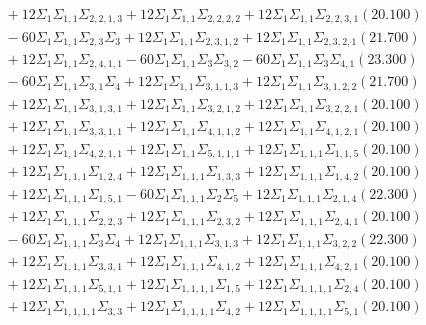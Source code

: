 \documentclass[12pt]{article}
\begin{document}
\begin{landscape}
\begin{align*}
		&\quad\quad +12\Sigma_{1}\Sigma_{1,1}\Sigma_{2,2,1,3}+12\Sigma_{1}\Sigma_{1,1}\Sigma_{2,2,2,2}+12\Sigma_{1}\Sigma_{1,1}\Sigma_{2,2,3,1}(20.100) \\ 
		&\quad\quad -60\Sigma_{1}\Sigma_{1,1}\Sigma_{2,3}\Sigma_{3}+12\Sigma_{1}\Sigma_{1,1}\Sigma_{2,3,1,2}+12\Sigma_{1}\Sigma_{1,1}\Sigma_{2,3,2,1}(21.700) \\ 
		&\quad\quad +12\Sigma_{1}\Sigma_{1,1}\Sigma_{2,4,1,1}-60\Sigma_{1}\Sigma_{1,1}\Sigma_{3}\Sigma_{3,2}-60\Sigma_{1}\Sigma_{1,1}\Sigma_{3}\Sigma_{4,1}(23.300) \\ 
		&\quad\quad -60\Sigma_{1}\Sigma_{1,1}\Sigma_{3,1}\Sigma_{4}+12\Sigma_{1}\Sigma_{1,1}\Sigma_{3,1,1,3}+12\Sigma_{1}\Sigma_{1,1}\Sigma_{3,1,2,2}(21.700) \\ 
		&\quad\quad +12\Sigma_{1}\Sigma_{1,1}\Sigma_{3,1,3,1}+12\Sigma_{1}\Sigma_{1,1}\Sigma_{3,2,1,2}+12\Sigma_{1}\Sigma_{1,1}\Sigma_{3,2,2,1}(20.100) \\ 
		&\quad\quad +12\Sigma_{1}\Sigma_{1,1}\Sigma_{3,3,1,1}+12\Sigma_{1}\Sigma_{1,1}\Sigma_{4,1,1,2}+12\Sigma_{1}\Sigma_{1,1}\Sigma_{4,1,2,1}(20.100) \\ 
		&\quad\quad +12\Sigma_{1}\Sigma_{1,1}\Sigma_{4,2,1,1}+12\Sigma_{1}\Sigma_{1,1}\Sigma_{5,1,1,1}+12\Sigma_{1}\Sigma_{1,1,1}\Sigma_{1,1,5}(20.100) \\ 
		&\quad\quad +12\Sigma_{1}\Sigma_{1,1,1}\Sigma_{1,2,4}+12\Sigma_{1}\Sigma_{1,1,1}\Sigma_{1,3,3}+12\Sigma_{1}\Sigma_{1,1,1}\Sigma_{1,4,2}(20.100) \\ 
		&\quad\quad +12\Sigma_{1}\Sigma_{1,1,1}\Sigma_{1,5,1}-60\Sigma_{1}\Sigma_{1,1,1}\Sigma_{2}\Sigma_{5}+12\Sigma_{1}\Sigma_{1,1,1}\Sigma_{2,1,4}(22.300) \\ 
		&\quad\quad +12\Sigma_{1}\Sigma_{1,1,1}\Sigma_{2,2,3}+12\Sigma_{1}\Sigma_{1,1,1}\Sigma_{2,3,2}+12\Sigma_{1}\Sigma_{1,1,1}\Sigma_{2,4,1}(20.100) \\ 
		&\quad\quad -60\Sigma_{1}\Sigma_{1,1,1}\Sigma_{3}\Sigma_{4}+12\Sigma_{1}\Sigma_{1,1,1}\Sigma_{3,1,3}+12\Sigma_{1}\Sigma_{1,1,1}\Sigma_{3,2,2}(22.300) \\ 
		&\quad\quad +12\Sigma_{1}\Sigma_{1,1,1}\Sigma_{3,3,1}+12\Sigma_{1}\Sigma_{1,1,1}\Sigma_{4,1,2}+12\Sigma_{1}\Sigma_{1,1,1}\Sigma_{4,2,1}(20.100) \\ 
		&\quad\quad +12\Sigma_{1}\Sigma_{1,1,1}\Sigma_{5,1,1}+12\Sigma_{1}\Sigma_{1,1,1,1}\Sigma_{1,5}+12\Sigma_{1}\Sigma_{1,1,1,1}\Sigma_{2,4}(20.100) \\ 
		&\quad\quad +12\Sigma_{1}\Sigma_{1,1,1,1}\Sigma_{3,3}+12\Sigma_{1}\Sigma_{1,1,1,1}\Sigma_{4,2}+12\Sigma_{1}\Sigma_{1,1,1,1}\Sigma_{5,1}(20.100) \\ 

\end{align*}
\end{landscape}
\end{document}
